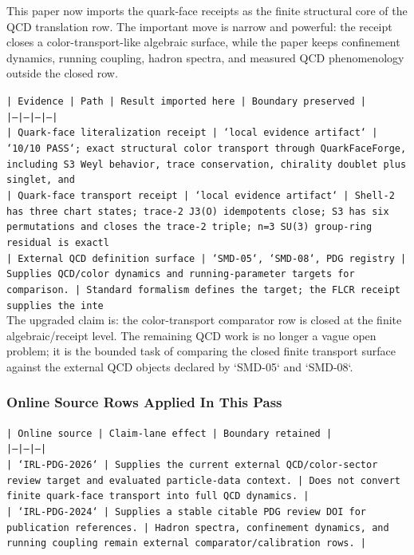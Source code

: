 \documentclass[11pt]{article}
\begin{document}
This paper now imports the quark-face receipts as the finite structural core of the QCD translation row. The important move is narrow and powerful: the receipt closes a color-transport-like algebraic surface, while the paper keeps confinement dynamics, running coupling, hadron spectra, and measured QCD phenomenology outside the closed row.

\noindent\texttt{| Evidence | Path | Result imported here | Boundary preserved |}\\
\noindent\texttt{|---|---|---|---|}\\
\noindent\texttt{| Quark-face literalization receipt | `local evidence artifact` | `10/10 PASS`; exact structural color transport through QuarkFaceForge, including S3 Weyl behavior, trace conservation, chirality doublet plus singlet, and}\\
\noindent\texttt{| Quark-face transport receipt | `local evidence artifact` | Shell-2 has three chart states; trace-2 J3(O) idempotents close; S3 has six permutations and closes the trace-2 triple; n=3 SU(3) group-ring residual is exactl}\\
\noindent\texttt{| External QCD definition surface | `SMD-05`, `SMD-08`, PDG registry | Supplies QCD/color dynamics and running-parameter targets for comparison. | Standard formalism defines the target; the FLCR receipt supplies the inte}\\

The upgraded claim is: the color-transport comparator row is closed at the finite algebraic/receipt level. The remaining QCD work is no longer a vague open problem; it is the bounded task of comparing the closed finite transport surface against the external QCD objects declared by `SMD-05` and `SMD-08`.

\subsubsection*{Online Source Rows Applied In This Pass}

\noindent\texttt{| Online source | Claim-lane effect | Boundary retained |}\\
\noindent\texttt{|---|---|---|}\\
\noindent\texttt{| `IRL-PDG-2026` | Supplies the current external QCD/color-sector review target and evaluated particle-data context. | Does not convert finite quark-face transport into full QCD dynamics. |}\\
\noindent\texttt{| `IRL-PDG-2024` | Supplies a stable citable PDG review DOI for publication references. | Hadron spectra, confinement dynamics, and running coupling remain external comparator/calibration rows. |}\\
\end{document}
